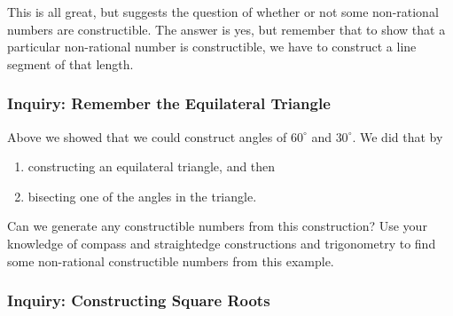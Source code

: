 \documentclass[11pt]{article}
\newenvironment{task}
	{\begin{mdframed}[linecolor=lightgray, linewidth=3pt]\raggedright}
	{\end{mdframed}}
\theoremstyle{definition}
\begin{document}
This is all great, but suggests the question of whether or not some non-rational numbers are constructible.  The answer is yes, but remember that to 
show that a particular non-rational number is constructible, we have to construct a line segment of that length.

\subsubsection{Inquiry: Remember the Equilateral Triangle}
\begin{task}
  Above we showed that we could construct angles of $60^\circ$ and $30^\circ$. We did that by
  \begin{enumerate}
    \item constructing an equilateral triangle, and then
    \item bisecting one of the angles in the triangle.
  \end{enumerate}
  Can we generate any constructible numbers from this construction? Use your knowledge of compass and straightedge constructions and trigonometry
  to find some non-rational constructible numbers from this example.
\end{task}

\subsubsection{Inquiry: Constructing Square Roots}
\end{document}
